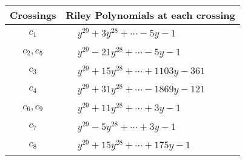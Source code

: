 \documentclass[1p]{elsarticle_modified}
\theoremstyle{definition}
\begin{document}
\begin{tabular}{m{50pt}|m{274pt}}
Crossings & \hspace{64pt}Riley Polynomials at each crossing \\
\hline $$\begin{aligned}c_{1}\end{aligned}$$&$\begin{aligned}
&y^{29}+3 y^{28}+\cdots-5 y-1
\end{aligned}$\\
\hline $$\begin{aligned}c_{2},c_{5}\end{aligned}$$&$\begin{aligned}
&y^{29}-21 y^{28}+\cdots-5 y-1
\end{aligned}$\\
\hline $$\begin{aligned}c_{3}\end{aligned}$$&$\begin{aligned}
&y^{29}+15 y^{28}+\cdots+1103 y-361
\end{aligned}$\\
\hline $$\begin{aligned}c_{4}\end{aligned}$$&$\begin{aligned}
&y^{29}+31 y^{28}+\cdots-1869 y-121
\end{aligned}$\\
\hline $$\begin{aligned}c_{6},c_{9}\end{aligned}$$&$\begin{aligned}
&y^{29}+11 y^{28}+\cdots+3 y-1
\end{aligned}$\\
\hline $$\begin{aligned}c_{7}\end{aligned}$$&$\begin{aligned}
&y^{29}-5 y^{28}+\cdots+3 y-1
\end{aligned}$\\
\hline $$\begin{aligned}c_{8}\end{aligned}$$&$\begin{aligned}
&y^{29}+15 y^{28}+\cdots+175 y-1
\end{aligned}$\\
\hline
\end{tabular}
\vskip 2pc
\end{document}
